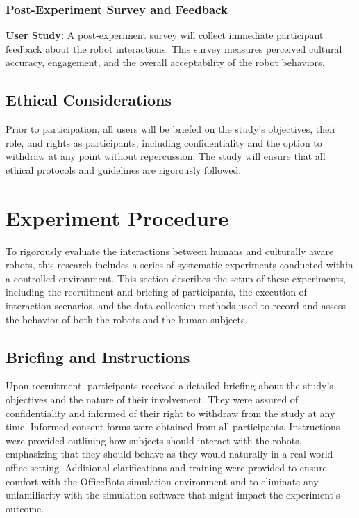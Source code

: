\subsubsection{Post-Experiment Survey and Feedback}

\textbf{User Study:} A post-experiment survey will collect immediate participant feedback about the robot interactions. This survey measures perceived cultural accuracy, engagement, and the overall acceptability of the robot behaviors.

\subsection{Ethical Considerations}

Prior to participation, all users will be briefed on the study's objectives, their role, and rights as participants, including confidentiality and the option to withdraw at any point without repercussion. The study will ensure that all ethical protocols and guidelines are rigorously followed.

\section{Experiment Procedure}

To rigorously evaluate the interactions between humans and culturally aware robots, this research includes a series of systematic experiments conducted within a controlled environment. This section describes the setup of these experiments, including the recruitment and briefing of participants, the execution of interaction scenarios, and the data collection methods used to record and assess the behavior of both the robots and the human subjects.

\subsection{Briefing and Instructions}

Upon recruitment, participants received a detailed briefing about the study's objectives and the nature of their involvement. They were assured of confidentiality and informed of their right to withdraw from the study at any time. Informed consent forms were obtained from all participants. Instructions were provided outlining how subjects should interact with the robots, emphasizing that they should behave as they would naturally in a real-world office setting. Additional clarifications and training were provided to ensure comfort with the OfficeBots simulation environment and to eliminate any unfamiliarity with the simulation software that might impact the experiment's outcome.

